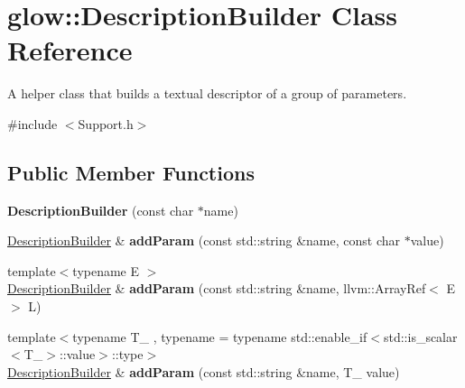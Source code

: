 \hypertarget{classglow_1_1_description_builder}{}\section{glow\+:\+:Description\+Builder Class Reference}
\label{classglow_1_1_description_builder}


A helper class that builds a textual descriptor of a group of parameters.  




{\ttfamily \#include $<$Support.\+h$>$}

\subsection*{Public Member Functions}
\begin{DoxyCompactItemize}
\item 
\mbox{\label{classglow_1_1_description_builder_aedfe4100586b6929aa664bebc3f15af9}} 
{\bfseries Description\+Builder} (const char $\ast$name)
\item 
\mbox{\label{classglow_1_1_description_builder_ab356eb63be20df38bbda9617ec05a51f}} 
\hyperlink{classglow_1_1_description_builder}{Description\+Builder} \& {\bfseries add\+Param} (const std\+::string \&name, const char $\ast$value)
\item 
\mbox{\label{classglow_1_1_description_builder_a07c58d0140912f70368a6ef5790adf53}} 
{\footnotesize template$<$typename E $>$ }\\\hyperlink{classglow_1_1_description_builder}{Description\+Builder} \& {\bfseries add\+Param} (const std\+::string \&name, llvm\+::\+Array\+Ref$<$ E $>$ L)
\item 
\mbox{\label{classglow_1_1_description_builder_a7354f40c8676bbb4fcda0fb31c4d1984}} 
{\footnotesize template$<$typename T\+\_\+ , typename  = typename std\+::enable\+\_\+if$<$std\+::is\+\_\+scalar$<$\+T\+\_\+$>$\+::value$>$\+::type$>$ }\\\hyperlink{classglow_1_1_description_builder}{Description\+Builder} \& {\bfseries add\+Param} (const std\+::string \&name, T\+\_\+ value)
\item 
\mbox{\label{classglow_1_1_description_builder_aa8fd5f5102de57f0ba8a1fc8b3bd61b9}} 

\end{DoxyCompactItemize}

